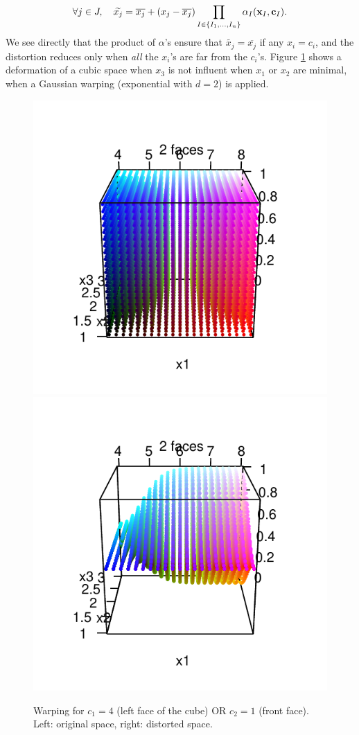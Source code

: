 \begin{equation}
 \forall j \in J, \quad \widetilde{x_j} = \overline{x_j} + \left( x_j - \overline{x_j}\right) \prod_{I \in \{I_1, \ldots, I_n \}}{\alpha_I}(\x_I, \cc_I)\label{eq:or0}. %
\end{equation}
% 
We see directly that the product of $\alpha$'s ensure that $\widetilde{x_j} = \overline{x_j}$
if any $x_i = c_i$, and the distortion reduces only when \emph{all} the $x_i$'s are far from the $c_i$'s.
Figure \ref{fig:def3DORs} shows a deformation of a cubic space when $x_3$ is not influent when $x_1$ or $x_2$ are minimal, when a Gaussian warping (exponential with $d=2$) is applied.
 \begin{figure}[!ht]
 \centering
 \includegraphics[width=.4\textwidth]{def3DORs.pdf}
 \includegraphics[width=.4\textwidth]{def3DOR2s.pdf}
 \caption{Warping for $c_1=4$ (left face of the cube) OR $c_2=1$ (front face). Left: original space, right: distorted space. %
 }\label{fig:def3DORs}
\end{figure}

